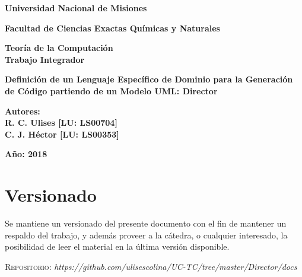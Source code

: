 \documentclass{report}
\begin{document}
\newpage
\begin{titlepage}
	\fontsize{14pt}{14pt} \selectfont
	\begin{center}{\bfseries Universidad Nacional de Misiones}\end{center}
	\vspace*{1\baselineskip}
	\begin{center}{\bfseries Facultad de Ciencias Exactas Químicas y
	Naturales}\end{center}
	\vspace*{2\baselineskip}
	\fontsize{16pt}{16pt} \selectfont
	\begin{center}{\bfseries {Teoría de la Computación\\Trabajo Integrador}}\end{center}
	\vspace*{2\baselineskip}
	\fontsize{18pt}{18pt} \selectfont
	\begin{center}{\bfseries Definición de un Lenguaje Específico de Dominio
	para la Generación de Código partiendo de un Modelo UML: Director}\end{center}
	\vspace*{2\baselineskip}
	\fontsize{16pt}{16pt} \selectfont
	\begin{center}{\bfseries Autores:\\R. C. Ulises [LU: LS00704]\\C. J. Héctor [LU: LS00353]}\end{center}
	\vspace*{\baselineskip}
	\fontsize{16pt}{16pt} \selectfont
	\begin{center}{}\end{center}
	\vspace*{2\baselineskip}
	\fontsize{16pt}{16pt} \selectfont
	\begin{center}{\bfseries Año: 2018}\end{center}
\end{titlepage}

\newpage
\section*{Versionado}
Se mantiene un versionado del presente documento con el fin de mantener un
respaldo del trabajo, y además proveer a la cátedra, o cualquier interesado, la
posibilidad de leer el material en la última versión disponible.

\begin{center}
  \textsc{Repositorio}: \textit{https://github.com/ulisescolina/UC-TC/tree/master/Director/docs}
\end{center}
\end{document}

